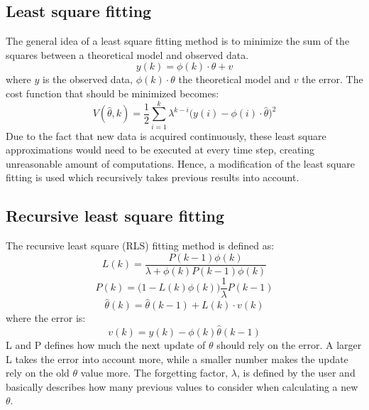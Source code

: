 \subsection{Least square fitting}
The general idea of a least square fitting method is to minimize the sum of the squares between a theoretical model and observed data. 
\begin{equation} 
	y(k) = \phi(k)\cdot\theta + v
	\label{eq:least_square}
\end{equation}
where $ y $ is the observed data, $ \phi(k)\cdot\theta $ the theoretical model and $ v $ the error. The cost function that should be minimized becomes:
\begin{equation}
	V(\hat{\theta}, k) = \dfrac{1}{2} \sum_{i=1}^{k} \lambda^{k-i}\Big(y(i) - \phi(i)\cdot\hat\theta \Big)^2
\end{equation}
Due to the fact that new data is acquired continuously, these least square approximations would need to be executed at every time step, creating unreasonable amount of computations. Hence, a modification of the least square fitting is used which recursively takes previous results into account.

\subsection{Recursive least square fitting}
The recursive least square (RLS) fitting method is defined as:
\begin{equation}
	L(k) =\dfrac{ P(k-1)\phi (k)}{\lambda + \phi (k) P(k-1)\phi(k)} 
\label{eq:RLS1}
\end{equation}
\begin{equation}
	P(k) = \Big( 1 - L(k)\phi (k) \Big) \dfrac{1}{\lambda} P(k-1)
\label{eq:RLS2}
\end{equation}
\begin{equation}
\hat \theta (k) = \hat \theta (k-1) + L(k) \cdot v(k)
\label{eq:RLS3}
\end{equation}
where the error is:
\begin{equation}
	v(k) = y(k) - \phi (k) \hat \theta (k-1)
	\label{eq:RLS4}
\end{equation}
L and P defines how much the next update of $ \theta $ should rely on the error. A larger L takes the error into account more, while a smaller number makes the update rely on the old $ \theta $ value more. The forgetting factor, $ \lambda $, is defined by the user and basically describes how many previous values to consider when calculating a new $ \theta $.

